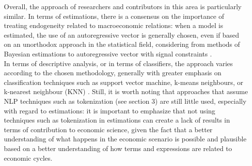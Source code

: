 Overall, the approach of researchers and contributors in this area is particularly similar. In terms of estimations, there is a consensus on the importance of treating endogeneity related to macroeconomic relations: when a model is estimated, the use of an autoregressive vector is generally chosen, even if based on an unorthodox approach in the statistical field, considering from methods of Bayesian estimations to autoregressive vector with signal constraints \citet{santos2020indice}.\\

In terms of descriptive analysis, or in terms of classifiers, the approach varies according to the chosen methodology, generally with greater emphasis on classification techniques such as support vector machine, k-means neighbours, or k-nearest neighbour (KNN) \citet{ostapenko2020macroeconomic}. Still, it is worth noting that approaches that assume NLP techniques such as tokenization (see section 3) are still little used, especially with regard to estimations: it is important to emphasize that not using techniques such as tokenization in estimations can create a lack of results in terms of contribution to economic science, given the fact that a better understanding of what happens in the economic scenario is possible and plausible based on a better understanding of how terms and expressions are related to economic cycles.\\



